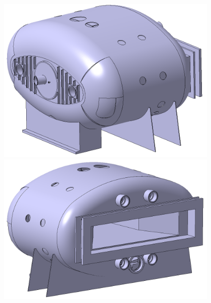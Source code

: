 \begin{figure}[H]
\begin{minipage}[b]{0.495\textwidth}
\includegraphics[width=0.95\textwidth]{pictures/GLAD1.png}
\caption{}
\label{fig:GLAD1}
\end{minipage}
\hspace{0.01\textwidth}
\begin{minipage}[b]{0.495\textwidth}
\includegraphics[width=0.95\textwidth]{pictures/GLAD2.png}
\caption{}
\label{fig:GLAD2}
\end{minipage}


\end{figure}
